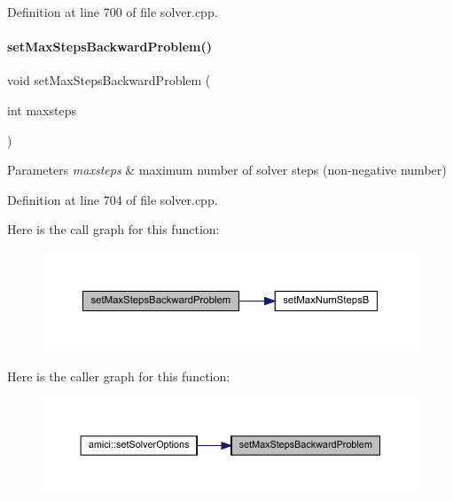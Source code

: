 Definition at line 700 of file solver.\+cpp.

\mbox{\label{classamici_1_1_solver_aa1d39cd744f489c17c3497c98acb7f59}} 
\paragraph{\texorpdfstring{setMaxStepsBackwardProblem()}{setMaxStepsBackwardProblem()}}
{\footnotesize\ttfamily void set\+Max\+Steps\+Backward\+Problem (\begin{DoxyParamCaption}\item[{int}]{maxsteps }\end{DoxyParamCaption})}


\begin{DoxyParams}{Parameters}
{\em maxsteps} & maximum number of solver steps (non-\/negative number) \\
\hline
\end{DoxyParams}


Definition at line 704 of file solver.\+cpp.

Here is the call graph for this function\+:
\nopagebreak
\begin{figure}[H]
\begin{center}
\leavevmode
\includegraphics[width=350pt]{classamici_1_1_solver_aa1d39cd744f489c17c3497c98acb7f59_cgraph}
\end{center}
\end{figure}
Here is the caller graph for this function\+:
\nopagebreak
\begin{figure}[H]
\begin{center}
\leavevmode
\includegraphics[width=350pt]{classamici_1_1_solver_aa1d39cd744f489c17c3497c98acb7f59_icgraph}
\end{center}
\end{figure}
\mbox{\label{classamici_1_1_solver_a60631d9a18e29c1102cae7cb77b9918c}} 
